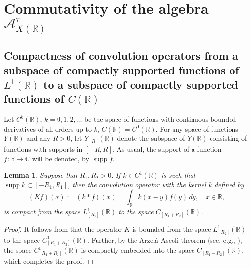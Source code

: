 \documentclass[reqno]{amsproc}
\newcommand{\cA}{\mathcal{A}}
\newcommand{\C}{\mathbb{C}}
\newcommand{\R}{\mathbb{R}}
\newtheorem{lemma}[theorem]{Lemma}
\theoremstyle{definition}
\theoremstyle{remark}
\numberwithin{equation}{section}
\begin{document}
\section{Commutativity of the algebra $\cA_{X(\R)}^\pi$}
\label{sec:commutativity}
\subsection{Compactness of convolution operators from a subspace of compactly 
supported functions of $L^1(\R)$ to a subspace of compactly
supported functions of $C(\R)$}
Let $C^k(\mathbb{R})$, $k = 0, 1, 2, \dots$ be the space of functions with 
continuous bounded derivatives of all orders up to $k$,
$C(\mathbb{R}) = C^0(\mathbb{R})$. For any space of functions $Y(\mathbb{R})$ 
and any $R > 0$, let $Y_{[R]}(\mathbb{R})$ denote the subspace of 
$Y(\mathbb{R})$ consisting of functions with supports in $[-R, R]$.
As usual, the support of a function $f:\R\to\C$ will be denoted, by 
$\operatorname{supp}f$.
\begin{lemma}\label{le:compact-convolution}
Suppose that $R_1,R_2>0$. If $k\in C^1(\R)$ is such that 
$\operatorname{supp}k\subset[-R_1,R_1]$, then the convolution operator with 
the kernel $k$ defined by
\begin{equation}\label{eq:compact-convolution}
(Kf)(x):=(k*f)(x)=\int_\R k(x-y)f(y)\,dy,
\quad x\in\R,
\end{equation}
is compact from the space $L^1_{[R_2]}(\R)$ to the space $C_{[R_1+R_2]}(\R)$.
\end{lemma}
\begin{proof}
It follows from \cite[Propositions~4.18 and 4.20]{B11} that the operator
$K$ is bounded from the space $L^1_{[R_2]}(\R)$ to the space 
$C^1_{[R_1+R_2]}(\R)$. Further, by the Arzel\`a-Ascoli theorem
(see, e.g., \cite[Theorems~2.2.12 and 2.5.10]{PKJF13}), the space 
$C_{[R_1+R_2]}^1(\R)$ is compactly embedded into the space 
$C_{[R_1+R_2]}(\R)$, which completes the proof.
\end{proof}
\end{document}
